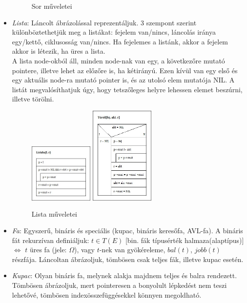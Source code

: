 \documentclass[margin=0px]{article}
\begin{document}
\begin{itemize}
\begin{figure}[H]
              \caption{Sor műveletei}
          \end{figure}
    \item \textit{Lista}: Láncolt ábrázolással reprezentáljuk. 3 szempont szerint különböztethetjük meg a listákat: fejelem van/nincs, láncolás iránya egy/kettő, ciklusosság van/nincs. Ha fejelemes a listánk, akkor a fejelem akkor is létezik, ha üres a lista. \\
          A lista node-okból áll, minden node-nak van egy, a következőre mutató pointere, illetve lehet az előzőre is, ha kétirányú. Ezen kívül van egy első és egy aktuális node-ra mutató pointer is, és az utolsó elem mutatója NIL. A listát megvalósíthatjuk úgy, hogy tetszőleges helyre lehessen elemet beszúrni, illetve törölni.
          \begin{figure}[H]
              \centering
              \includegraphics[width=0.3\textwidth]{img/Listaba.jpg}
              \includegraphics[width=0.3\textwidth]{img/Torol.jpg}
              \caption{Lista műveletei}
          \end{figure}
    \item \textit{Fa}: Egyszerű, bináris és speciális (kupac, bináris keresőfa, AVL-fa). A bináris fát rekurzívan definiáljuk: $t \in T(E)$ [bin. fák típusérték halmaza(alaptípus)] $\iff$ $t$ üres fa (jele: $\Omega$), vagy $t$-nek van gyökéreleme, $bal(t)$, $jobb(t)$ részfája. Láncoltan ábrázoljuk, tömbösen csak teljes fák, illetve kupac esetén.
    \item \textit{Kupac}: Olyan bináris fa, melynek alakja majdnem teljes és balra rendezett. Tömbösen ábrázoljuk, mert pointeresen a bonyolult lépkedést nem teszi lehetővé, tömbösen indexösszefüggésekkel könnyen megoldható.

\end{itemize}
\end{document}
